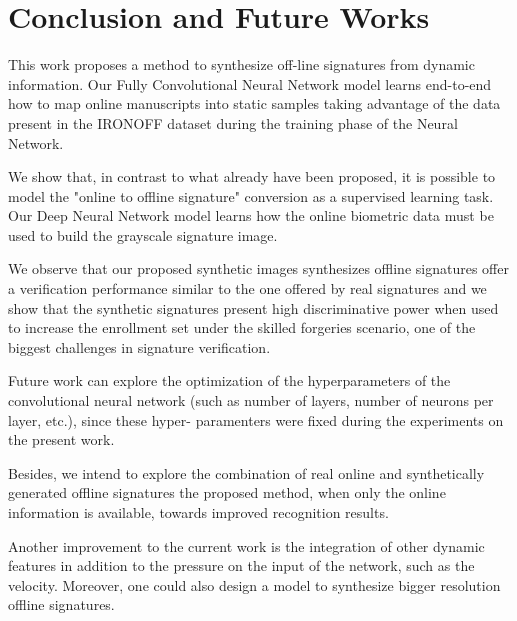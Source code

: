 
\chapter{Conclusion and Future Works}\label{ch:conclusion}
This work proposes a method to synthesize off-line signatures from dynamic information. Our Fully Convolutional Neural Network model learns end-to-end how to map online manuscripts into static samples taking advantage of the data present in the IRONOFF dataset during the training phase of the Neural Network. 

We show that, in contrast to what already have been proposed, it is possible to model the "online to offline signature" conversion as a supervised learning task. Our Deep Neural Network model learns how the online biometric data must be used to build the grayscale signature image.
   
We observe that our proposed synthetic images  synthesizes offline signatures offer a verification performance similar to the one offered by real signatures and we show that the synthetic signatures present high discriminative power when used to increase the enrollment set under the skilled forgeries scenario, one of the biggest challenges in signature verification. 

Future work can explore the optimization of the hyperparameters of the convolutional neural
network (such as number of layers, number of neurons per layer, etc.), since these hyper-
paramenters were fixed during the experiments on the present work.

Besides, we intend to explore the combination of real online and synthetically generated offline signatures the proposed method, when only the online information is available, towards improved recognition results.

Another improvement to the current work is the integration of other dynamic features in addition to the pressure on the input of the network, such as the velocity. Moreover, one could also design a model to synthesize bigger resolution offline signatures.